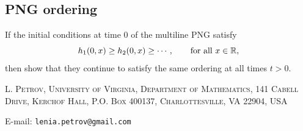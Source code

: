 \documentclass[letterpaper,11pt,oneside,reqno]{article}
\numberwithin{equation}{section}
\theoremstyle{definition}
\begin{document}
\subsection{PNG ordering}
\label{prob:multiline-png}

If the initial conditions at time $0$ of the multiline PNG satisfy
\begin{equation*}
	h_1(0,x) \ge h_2(0,x) \ge \cdots ,\qquad \textnormal{for all } x\in\mathbb{R},
\end{equation*}
then show that they continue to satisfy the same ordering at all times $t>0$.







\medskip

\textsc{L. Petrov, University of Virginia, Department of Mathematics, 141 Cabell Drive, Kerchof Hall, P.O. Box 400137, Charlottesville, VA 22904, USA}

E-mail: \texttt{lenia.petrov@gmail.com}
\end{document}
